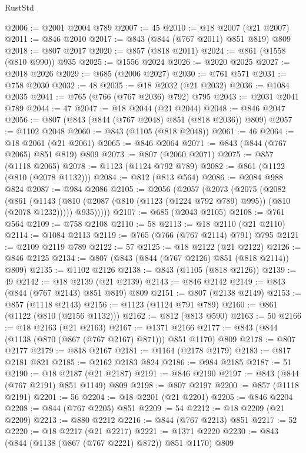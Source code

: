 \begin{lexlean}{RustStd}
\begin{coremodule}
@2006 := @2001 @2004 @789
@2007 := 45
@2010 := @18 @2007 (@21 @2007)
@2011 := @846 @2010
@2017 := @843 (@844 (@767 @2011) @851 @819) @809
@2018 := @807 @2017
@2020 := @857 (@818 @2011)
@2024 := @861 (@1558 (@810 @990)) @935
@2025 := @1556 @2024
@2026 := @2020 @2025
@2027 := @2018 @2026
@2029 := @685 (@2006 @2027)
@2030 := @761 @571
@2031 := @758 @2030
@2032 := 48
@2035 := @18 @2032 (@21 @2032)
@2036 := @1084 @2035
@2041 := @765 (@766 (@767 @2036) @792) @795
@2043 := @2031 @2041 @789
@2044 := 47
@2047 := @18 @2044 (@21 @2044)
@2048 := @846 @2047
@2056 := @807 (@843 (@844 (@767 @2048) @851 (@818 @2036)) @809)
@2057 := @1102 @2048
@2060 := @843 (@1105 (@818 @2048))
@2061 := 46
@2064 := @18 @2061 (@21 @2061)
@2065 := @846 @2064
@2071 := @843 (@844 (@767 @2065) @851 @819) @809
@2073 := @807 (@2060 @2071)
@2075 := @857 (@1118 @2065)
@2078 := @1123 (@1124 @792 @789)
@2082 := @861 (@1122 (@810 (@2078 @1132)))
@2084 := @812 (@813 @564)
@2086 := @2084 @988 @824
@2087 := @984 @2086
@2105 := @2056
    (@2057
      (@2073
        (@2075
          (@2082
            (@861
              (@1143 (@810 (@2087 (@810 (@1123 (@1224 @792 @789) @995)) (@810 (@2078 @1232)))))
              @935)))))
@2107 := @685 (@2043 @2105)
@2108 := @761 @564
@2109 := @758 @2108
@2110 := 58
@2113 := @18 @2110 (@21 @2110)
@2114 := @1084 @2113
@2119 := @765 (@766 (@767 @2114) @791) @795
@2121 := @2109 @2119 @789
@2122 := 57
@2125 := @18 @2122 (@21 @2122)
@2126 := @846 @2125
@2134 := @807 (@843 (@844 (@767 @2126) @851 (@818 @2114)) @809)
@2135 := @1102 @2126
@2138 := @843 (@1105 (@818 @2126))
@2139 := 49
@2142 := @18 @2139 (@21 @2139)
@2143 := @846 @2142
@2149 := @843 (@844 (@767 @2143) @851 @819) @809
@2151 := @807 (@2138 @2149)
@2153 := @857 (@1118 @2143)
@2156 := @1123 (@1124 @791 @789)
@2160 := @861 (@1122 (@810 (@2156 @1132)))
@2162 := @812 (@813 @590)
@2163 := 50
@2166 := @18 @2163 (@21 @2163)
@2167 := @1371 @2166
@2177 := @843 (@844 (@1138 (@870 (@867 (@767 @2167) @871))) @851 @1170) @809
@2178 := @807 @2177
@2179 := @818 @2167
@2181 := @1164 (@2178 @2179)
@2183 := @817 @2181 @821
@2185 := @2162 @2183 @824
@2186 := @984 @2185
@2187 := 51
@2190 := @18 @2187 (@21 @2187)
@2191 := @846 @2190
@2197 := @843 (@844 (@767 @2191) @851 @1149) @809
@2198 := @807 @2197
@2200 := @857 (@1118 @2191)
@2201 := 56
@2204 := @18 @2201 (@21 @2201)
@2205 := @846 @2204
@2208 := @844 (@767 @2205) @851
@2209 := 54
@2212 := @18 @2209 (@21 @2209)
@2213 := @880 @2212
@2216 := @844 (@767 @2213) @851
@2217 := 52
@2220 := @18 @2217 (@21 @2217)
@2221 := @1371 @2220
@2230 := @843 (@844 (@1138 (@867 (@767 @2221) @872)) @851 @1170) @809

\end{coremodule}
\end{lexlean}
